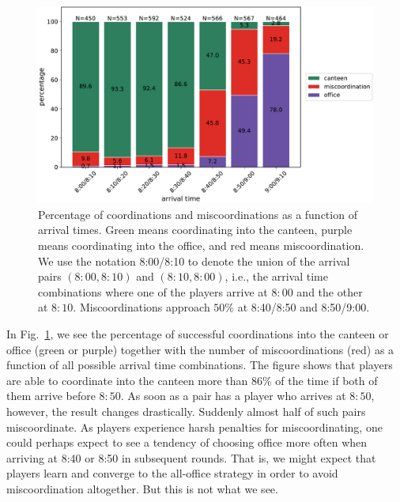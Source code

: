 \documentclass[twocolumn,a4paper,superscriptaddress,nofootinbib]{revtex4}
\begin{document}
\begin{figure} %
\centering\includegraphics[width=0.8\linewidth]{fig3_miscoordinations}
\caption{Percentage of coordinations and miscoordinations as a function of arrival times. Green means coordinating into the canteen, purple means coordinating into the office, and red means miscoordination. We use the notation 8:00/8:10 to denote the union of the arrival pairs $(8{:}00,8{:}10)$ and $(8{:}10,8{:}00)$, i.e., the arrival time combinations where one of the players arrive at $8{:}00$ and the other at $8{:}10$. Miscoordinations approach $50\%$ at 8:40/8:50 and 8:50/9:00.}
\label{fig:miscoordinations}
\end{figure}

In Fig.~\ref{fig:miscoordinations}, we see the percentage of successful coordinations into the canteen or office (green or purple) together with the number of miscoordinations (red) as a function of all possible arrival time combinations. The figure shows that players are able to coordinate into the canteen more than 86\% of the time if both of them arrive before $8{:}50$. As soon as a pair has a player who arrives at $8{:}50$, however, the result changes drastically. Suddenly almost half of such pairs miscoordinate. As players experience harsh penalties for miscoordinating, one could perhaps expect to see a tendency of choosing office more often when arriving at 8:40 or 8:50 in subsequent rounds. That is, we might expect that players learn and converge to the all-office strategy in order to avoid miscoordination altogether. But this is not what we see.
\end{document}
